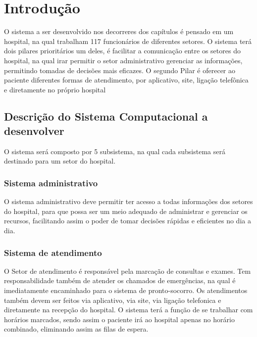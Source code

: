 

\chapter{ Introdu\c{c}\~{a}o}

O sistema a ser desenvolvido nos decorreres dos capítulos é pensado em um hospital, na qual trabalham 117 funcionários de diferentes setores. O sistema terá dois pilares prioritários um deles, é facilitar a comunicação entre os setores do hospital, na qual irar permitir o setor administrativo gerenciar as informações, permitindo tomadas de decisões mais eficazes. O segundo Pilar é oferecer ao paciente diferentes formas de atendimento, por aplicativo, site, ligação telefônica e diretamente no próprio hospital

 \section{Descri\c{c}\~{a}o do Sistema Computacional a desenvolver}
O sistema será composto por 5 subsistema, na qual cada subsistema será destinado para um setor do hospital.
        \subsection{Sistema administrativo}
 O sistema administrativo deve permitir ter acesso a todas informações dos setores do hospital, para que possa ser um meio adequado de administrar e gerenciar os recursos, facilitando assim o poder de tomar decisões rápidas e eficientes no dia a dia.

        \subsection{Sistema de atendimento}
O Setor de atendimento é responsável pela marcação de consultas e exames. Tem   responsabilidade também de atender os chamados de emergências, na qual é imediatamente encaminhado para o sistema de pronto-socorro. Os atendimentos também devem ser feitos via aplicativo, via site, via ligação telefonica e diretamente na recepção do hospital. O sistema terá a função de se trabalhar com horários marcados, sendo assim o paciente irá ao hospital apenas no horário combinado, eliminando assim as filas de espera.
